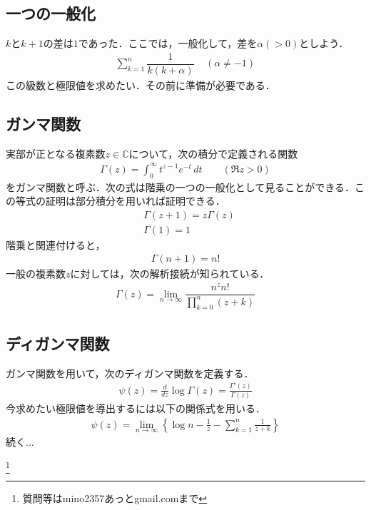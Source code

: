 \documentclass[12pt]{jsarticle}
\begin{document}
\subsection*{一つの一般化}
$k$と$k+1$の差は$1$であった．ここでは，一般化して，差を$\alpha(>0)$としよう．
\begin{align*}
\sum_{k=1}^{n} \dfrac{1}{k(k+\alpha)} \ \ \ \ \ (\alpha \neq -1)
\end{align*}
この級数と極限値を求めたい．その前に準備が必要である．

\subsection*{ガンマ関数}
実部が正となる複素数$z \in \mathbb{C}$について，次の積分で定義される関数
\begin{align*}
\Gamma (z)=\int _{0}^{\infty }t^{z-1}e^{-t}\,dt\qquad (\Re {z}>0)
\end{align*}
をガンマ関数と呼ぶ．次の式は階乗の一つの一般化として見ることができる．この等式の証明は部分積分を用いれば証明できる．
\begin{align*}
&\Gamma (z+1)=z\Gamma (z)\\
&\Gamma (1) = 1
\end{align*}
階乗と関連付けると，
\begin{align*}
\Gamma (n+1)=n!
\end{align*}
一般の複素数$z$に対しては，次の解析接続が知られている．
\begin{align*}
\Gamma (z)=\lim _{n\to \infty }{\dfrac {n^{z}n!}{\prod_{k=0}^{n}{(z+k)}}}
\end{align*}

\subsection*{ディガンマ関数}
ガンマ関数を用いて，次のディガンマ関数を定義する．
\begin{align*}
\psi (z)={\frac  {d}{dz}}\log {\Gamma (z)}={\frac  {\Gamma '(z)}{\Gamma (z)}}
\end{align*}
今求めたい極限値を導出するには以下の関係式を用いる．
\begin{align*}
\psi (z)=\lim _{{n\to \infty }}\left\{\log {n}-{\frac  {1}{z}}-\sum _{{k=1}}^{{n}}{\frac  {1}{z+k}}\right\}
\end{align*}
続く...

\footnote[0]{
質問等はmino2357あっとgmail.comまで
}

\thispagestyle{empty}
\end{document}
